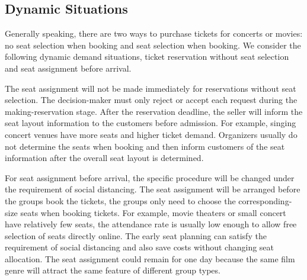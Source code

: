 

\subsection{Dynamic Situations}
Generally speaking, there are two ways to purchase tickets for concerts or movies: no seat selection when booking and seat selection when booking. We consider the following dynamic demand situations, ticket reservation without seat selection and seat assignment before arrival.

The seat assignment will not be made immediately for reservations without seat selection. The decision-maker must only reject or accept each request during the making-reservation stage. After the reservation deadline, the seller will inform the seat layout information to the customers before admission. For example, singing concert venues have more seats and higher ticket demand. Organizers usually do not determine the seats when booking and then inform customers of the seat information after the overall seat layout is determined.





For seat assignment before arrival, the specific procedure will be changed under the requirement of social distancing. The seat assignment will be arranged before the groups book the tickets, the groups only need to choose the corresponding-size seats when booking tickets. For example, movie theaters or small concert have relatively few seats, the attendance rate is usually low enough to allow free selection of seats directly online. The early seat planning can satisfy the requirement of social distancing and also save costs without changing seat allocation. The seat assignment could remain for one day because the same film genre will attract the same feature of different group types. 



